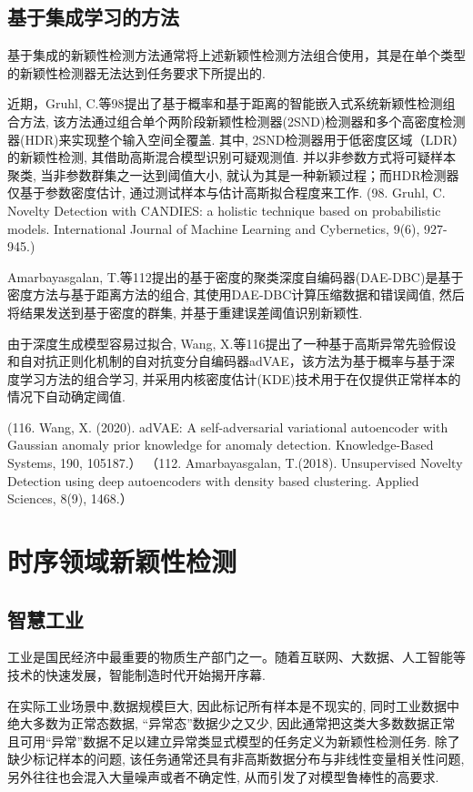 \documentclass{Style/aas}
\begin{document}
\begin{multicols}{2}
  \subsection{基于集成学习的方法}
  基于集成的新颖性检测方法通常将上述新颖性检测方法组合使用，其是在单个类型的新颖性检测器无法达到任务要求下所提出的.

  近期，Gruhl, C.等98提出了基于概率和基于距离的智能嵌入式系统新颖性检测组合方法, 该方法通过组合单个两阶段新颖性检测器(2SND)检测器和多个高密度检测器(HDR)来实现整个输入空间全覆盖. 其中, 2SND检测器用于低密度区域（LDR）的新颖性检测, 其借助高斯混合模型识别可疑观测值. 并以非参数方式将可疑样本聚类, 当非参数群集之一达到阈值大小, 就认为其是一种新颖过程；而HDR检测器仅基于参数密度估计, 通过测试样本与估计高斯拟合程度来工作. (98.	Gruhl, C. Novelty Detection with CANDIES: a holistic technique based on probabilistic models. International Journal of Machine Learning and Cybernetics, 9(6), 927-945.)

  Amarbayasgalan, T.等112提出的基于密度的聚类深度自编码器(DAE-DBC)是基于密度方法与基于距离方法的组合, 其使用DAE-DBC计算压缩数据和错误阈值, 然后将结果发送到基于密度的群集, 并基于重建误差阈值识别新颖性.

  由于深度生成模型容易过拟合, Wang, X.等116提出了一种基于高斯异常先验假设和自对抗正则化机制的自对抗变分自编码器adVAE，该方法为基于概率与基于深度学习方法的组合学习, 并采用内核密度估计(KDE)技术用于在仅提供正常样本的情况下自动确定阈值.

  (116.	Wang, X. (2020). adVAE: A self-adversarial variational autoencoder with Gaussian anomaly prior knowledge for anomaly detection. Knowledge-Based Systems, 190, 105187.）
  （112.	Amarbayasgalan, T.(2018). Unsupervised Novelty Detection using deep autoencoders with density based clustering. Applied Sciences, 8(9), 1468.）



  \section{时序领域新颖性检测}
  \subsection{智慧工业}

  工业是国民经济中最重要的物质生产部门之一。随着互联网、大数据、人工智能等技术的快速发展，智能制造时代开始揭开序幕.

  在实际工业场景中,数据规模巨大, 因此标记所有样本是不现实的, 同时工业数据中绝大多数为正常态数据, “异常态”数据少之又少, 因此通常把这类大多数数据正常且可用“异常”数据不足以建立异常类显式模型的任务定义为新颖性检测任务. 除了缺少标记样本的问题, 该任务通常还具有非高斯数据分布与非线性变量相关性问题, 另外往往也会混入大量噪声或者不确定性, 从而引发了对模型鲁棒性的高要求.


\end{multicols}
\end{document}
